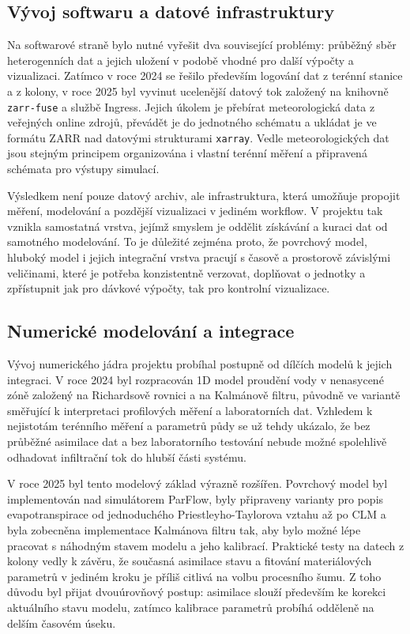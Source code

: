 \documentclass[11pt,a4paper]{article}
\begin{document}
\begin{onehalfspacing}
\subsection{Vývoj softwaru a datové infrastruktury}
Na softwarové straně bylo nutné vyřešit dva související problémy: průběžný
sběr heterogenních dat a jejich uložení v podobě vhodné pro další výpočty a
vizualizaci. Zatímco v roce 2024 se řešilo především logování dat z terénní
stanice a z kolony, v roce 2025 byl vyvinut ucelenější datový tok založený
na knihovně \texttt{zarr-fuse} a službě Ingress. Jejich úkolem je přebírat
meteorologická data z veřejných online zdrojů, převádět je do jednotného
schématu a ukládat je ve formátu ZARR nad datovými strukturami
\texttt{xarray}. Vedle meteorologických dat jsou stejným principem
organizována i vlastní terénní měření a připravená schémata pro výstupy
simulací.

Výsledkem není pouze datový archiv, ale infrastruktura, která umožňuje
propojit měření, modelování a pozdější vizualizaci v jediném workflow. V
projektu tak vznikla samostatná vrstva, jejímž smyslem je oddělit získávání a
kuraci dat od samotného modelování. To je důležité zejména proto, že povrchový
model, hluboký model i jejich integrační vrstva pracují s časově a prostorově
závislými veličinami, které je potřeba konzistentně verzovat, doplňovat o
jednotky a zpřístupnit jak pro dávkové výpočty, tak pro kontrolní vizualizace.

\subsection{Numerické modelování a integrace}
Vývoj numerického jádra projektu probíhal postupně od dílčích modelů k jejich
integraci. V roce 2024 byl rozpracován 1D model proudění vody v nenasycené
zóně založený na Richardsově rovnici a na Kalmánově filtru, původně ve
variantě směřující k interpretaci profilových měření a laboratorních dat.
Vzhledem k nejistotám terénního měření a parametrů půdy se už tehdy ukázalo,
že bez průběžné asimilace dat a bez laboratorního testování nebude možné
spolehlivě odhadovat infiltrační tok do hlubší části systému.

V roce 2025 byl tento modelový základ výrazně rozšířen. Povrchový model byl
implementován nad simulátorem ParFlow, byly připraveny varianty pro popis
evapotranspirace od jednoduchého Priestleyho-Taylorova vztahu až po CLM a
byla zobecněna implementace Kalmánova filtru tak, aby bylo možné lépe
pracovat s náhodným stavem modelu a jeho kalibrací. Praktické testy na datech
z kolony vedly k závěru, že současná asimilace stavu a fitování materiálových
parametrů v jediném kroku je příliš citlivá na volbu procesního šumu. Z toho
důvodu byl přijat dvouúrovňový postup: asimilace slouží především ke korekci
aktuálního stavu modelu, zatímco kalibrace parametrů probíhá odděleně na
delším časovém úseku.


\end{onehalfspacing}
\end{document}
